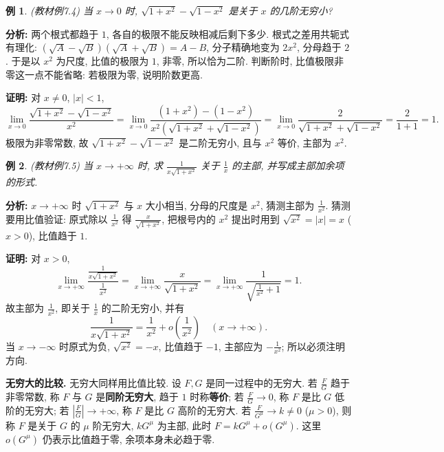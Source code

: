 \documentclass[UTF8,openany]{ctexbook}
\theoremstyle{chinesetextbook}
\newtheorem{example}{例}[section]
\newenvironment{cnproof}{\par\indent\textbf{证明:} \ignorespaces}{\par}
\begin{document}
\begin{example}
\textnormal{(教材例7.4)} 当 $x\to0$ 时, $\sqrt{1+x^2}-\sqrt{1-x^2}$ 是关于 $x$ 的几阶无穷小?
\end{example}
\par\indent\textbf{分析:} 两个根式都趋于 $1$, 各自的极限不能反映相减后剩下多少. 根式之差用共轭式有理化: $(\sqrt A-\sqrt B)(\sqrt A+\sqrt B)=A-B$, 分子精确地变为 $2x^2$, 分母趋于 $2$. 于是以 $x^2$ 为尺度, 比值的极限为 $1$, 非零, 所以恰为二阶. 判断阶时, 比值极限非零这一点不能省略: 若极限为零, 说明阶数更高.
\begin{cnproof}
对 $x\ne0$, $|x|<1$,
\[
\lim_{x\to0}\frac{\sqrt{1+x^2}-\sqrt{1-x^2}}{x^2}
=\lim_{x\to0}\frac{(1+x^2)-(1-x^2)}{x^2\left(\sqrt{1+x^2}+\sqrt{1-x^2}\right)}
=\lim_{x\to0}\frac2{\sqrt{1+x^2}+\sqrt{1-x^2}}=\frac2{1+1}=1.
\]
极限为非零常数, 故 $\sqrt{1+x^2}-\sqrt{1-x^2}$ 是二阶无穷小, 且与 $x^2$ 等价, 主部为 $x^2$.
\end{cnproof}
\begin{example}
\textnormal{(教材例7.5)} 当 $x\to+\infty$ 时, 求 $\displaystyle \frac1{x\sqrt{1+x^2}}$ 关于 $\displaystyle\frac1x$ 的主部, 并写成主部加余项的形式.
\end{example}
\par\indent\textbf{分析:} $x\to+\infty$ 时 $\sqrt{1+x^2}$ 与 $x$ 大小相当, 分母的尺度是 $x^2$, 猜测主部为 $\displaystyle\frac1{x^2}$. 猜测要用比值验证: 原式除以 $\displaystyle\frac1{x^2}$ 得 $\displaystyle\frac x{\sqrt{1+x^2}}$, 把根号内的 $x^2$ 提出时用到 $\sqrt{x^2}=|x|=x$ ($x>0$), 比值趋于 $1$.
\begin{cnproof}
对 $x>0$,
\[
\lim_{x\to+\infty}\frac{\frac1{x\sqrt{1+x^2}}}{\frac1{x^2}}
=\lim_{x\to+\infty}\frac{x}{\sqrt{1+x^2}}
=\lim_{x\to+\infty}\frac1{\sqrt{\frac1{x^2}+1}}=1.
\]
故主部为 $\displaystyle\frac1{x^2}$, 即关于 $\displaystyle\frac1x$ 的二阶无穷小, 并有
\[
\frac1{x\sqrt{1+x^2}}=\frac1{x^2}+o\!\left(\frac1{x^2}\right)\quad(x\to+\infty).
\]
当 $x\to-\infty$ 时原式为负, $\sqrt{x^2}=-x$, 比值趋于 $-1$, 主部应为 $\displaystyle-\frac1{x^2}$; 所以必须注明方向.
\end{cnproof}
\par\indent\textbf{无穷大的比较.} 无穷大同样用比值比较. 设 $F,G$ 是同一过程中的无穷大. 若 $\displaystyle\frac FG$ 趋于非零常数, 称 $F$ 与 $G$ 是\textbf{同阶无穷大}, 趋于 $1$ 时称\textbf{等价}; 若 $\displaystyle\frac FG\to0$, 称 $F$ 是比 $G$ 低阶的无穷大; 若 $\displaystyle\left|\frac FG\right|\to+\infty$, 称 $F$ 是比 $G$ 高阶的无穷大. 若 $\displaystyle\frac F{G^\mu}\to k\ne0$ ($\mu>0$), 则称 $F$ 是关于 $G$ 的 $\mu$ 阶无穷大, $kG^\mu$ 为主部, 此时 $F=kG^\mu+o(G^\mu)$. 这里 $o(G^\mu)$ 仍表示比值趋于零, 余项本身未必趋于零.
\end{document}
